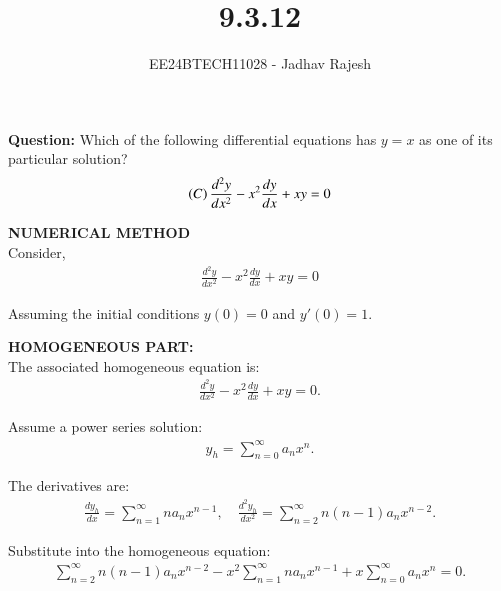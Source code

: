 \documentclass[journal]{IEEEtran}
\begin{document}

\vspace{3cm}
\title{9.3.12}
\author{EE24BTECH11028 - Jadhav Rajesh}
{\let\newpage\relax\maketitle}

\renewcommand{\thefigure}{\theenumi}
\renewcommand{\thetable}{\theenumi}
\setlength{\intextsep}{10pt} %


\renewcommand{\thetable}{\theenumi}
\textbf{Question:} Which of the following differential equations has $y = x$ as one of its particular solution?\\
 \begin{align}
 \left(C\right)  \frac{d^{2}y}{dx^{2}}-x^{2}\frac{dy}{dx}+xy=0
 \end{align}
                         
 \solution 
 \textbf{NUMERICAL METHOD}\\
	
Consider,
\begin{align}
\frac{d^2y}{dx^2} - x^2\frac{dy}{dx} + xy = 0
\end{align}

Assuming the initial conditions $y(0) = 0$ and $y'(0) = 1.$


\textbf{HOMOGENEOUS PART:}\\

The associated homogeneous equation is:
\begin{align}
\frac{d^2y}{dx^2} - x^2\frac{dy}{dx} + xy = 0.
\end{align}

Assume a power series solution:
\begin{align}
y_h = \sum_{n=0}^\infty a_n x^n.
\end{align}

The derivatives are:
\begin{align}
\frac{dy_h}{dx} = \sum_{n=1}^\infty n a_n x^{n-1}, \quad 
\frac{d^2y_h}{dx^2} = \sum_{n=2}^\infty n(n-1)a_n x^{n-2}.
\end{align}

Substitute into the homogeneous equation:
\begin{align}
\sum_{n=2}^\infty n(n-1)a_n x^{n-2} - x^2 \sum_{n=1}^\infty n a_n x^{n-1} + x \sum_{n=0}^\infty a_n x^n = 0.
\end{align}
\end{document}
